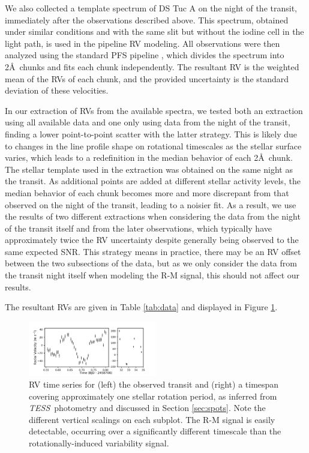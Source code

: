 \documentclass[twocolumn]{aastex63}
\newcommand{\tess}{{\it TESS}}
\begin{document}
We also collected a template spectrum of DS Tuc A on the night of the transit, immediately after the observations described above.
This spectrum, obtained under similar conditions and with the same slit but without the iodine cell in the light path, is used in the pipeline RV modeling.
All observations were then analyzed using the standard PFS pipeline \citep{Butler96b}, which divides the spectrum into 2\AA\ chunks and fits each chunk independently.
The resultant RV is the weighted mean of the RVs of each chunk, and the provided uncertainty is the standard deviation of these velocities.




In our extraction of RVs from the available spectra, we tested both an extraction using all available data and one only using data from the night of the transit, finding a lower point-to-point scatter with the latter strategy. 
This is likely due to changes in the line profile shape on rotational timescales as the stellar surface varies, which leads to a redefinition in the median behavior of each 2\AA\ chunk.
The stellar template used in the extraction was obtained on the same night as the transit.
As additional points are added at different stellar activity levels, the median behavior of each chunk becomes more and more discrepant from that observed on the night of the transit, leading to a noisier fit. 
As a result, we use the results of two different extractions when considering the data from the night of the transit itself and from the later observations, which typically have approximately twice the RV uncertainty despite generally being observed to the same expected SNR.
This strategy means in practice, there may be an RV offset between the two subsections of the data, but as we only consider the data from the transit night itself when modeling the R-M signal, this should not affect our results.

The resultant RVs are given in Table \ref{tab:data} and displayed in Figure \ref{fig:data}.



\begin{figure}[!tbh]
  \begin{center}
    \includegraphics[width=0.5\textwidth, trim={0cm 0.0cm 0cm 0cm}, clip=true]{../figures/all_data.pdf}
   \end{center}
  \caption{RV time series for (left) the observed transit and (right) a timespan covering approximately one stellar rotation period, as inferred from \tess\ photometry and discussed in Section \ref{sec:spots}. Note the different vertical scalings on each subplot. The R-M signal is easily detectable, occurring over a significantly different timescale than the rotationally-induced variability signal.}
  \label{fig:data}
\end{figure}
\end{document}
